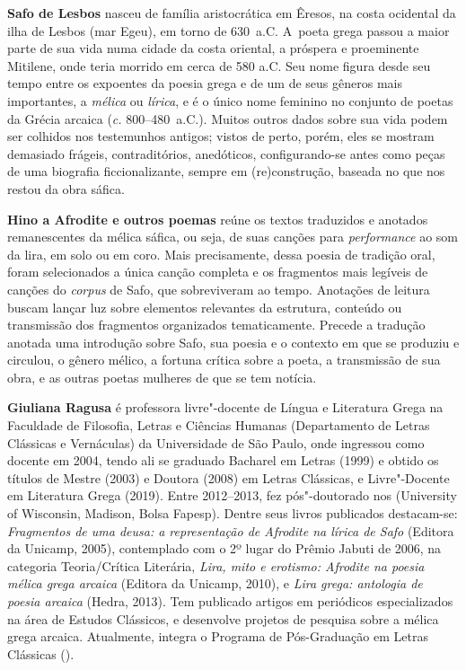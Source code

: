 \textbf{Safo de Lesbos} nasceu de família aristocrática em Êresos, na costa ocidental da ilha de Lesbos
(mar Egeu), em torno de 630~a.C. A~poeta grega passou a maior parte de
sua vida numa cidade da costa oriental, a próspera e proeminente Mitilene, onde
teria morrido em cerca de 580 a.C. Seu nome figura desde seu tempo entre os
expoentes da poesia grega e de um de seus gêneros mais importantes, a
\textit{mélica} ou \textit{lírica}, e é o único nome feminino no conjunto de
poetas da Grécia arcaica (\textit{c.} 800--480~a.C.). Muitos outros dados sobre
sua vida podem ser colhidos nos testemunhos antigos; vistos de perto, porém,
eles se mostram demasiado frágeis, contraditórios, anedóticos, configurando-se
antes como peças de uma biografia ficcionalizante, sempre em (re)construção,
baseada no que nos restou da obra sáfica.

\textbf{Hino a Afrodite e outros poemas} reúne os textos traduzidos e anotados 
remanescentes da mélica sáfica, ou seja, de suas canções para \textit{performance} 
ao som da lira, em solo ou em coro. Mais precisamente, dessa poesia de
tradição oral, foram selecionados a única canção completa e os fragmentos mais legíveis  
de canções do \textit{corpus} de Safo, que sobreviveram ao tempo. 
Anotações de leitura buscam lançar luz sobre elementos
relevantes da estrutura, conteúdo ou transmissão dos fragmentos organizados
tematicamente. Precede a tradução anotada uma introdução sobre Safo, sua poesia
e o contexto em que se produziu e circulou, o gênero mélico, a fortuna crítica
sobre a poeta, a transmissão de sua obra, e as outras poetas mulheres de que
se tem notícia. 

\textbf{Giuliana Ragusa} é professora livre"-docente de Língua e Literatura Grega na Faculdade de Filosofia, Letras e Ciências Humanas (Departamento de Letras Clássicas e Vernáculas) da Universidade de São Paulo, onde ingressou como docente em 2004, tendo ali se graduado Bacharel em Letras (1999) e obtido os títulos de Mestre (2003) e Doutora (2008) em Letras Clássicas, e Livre"-Docente em Literatura Grega (2019). Entre 2012--2013, fez pós"-doutorado nos  (University of Wisconsin, Madison, Bolsa Fapesp). Dentre seus livros publicados destacam-se: 
\textit{Fragmentos de uma deusa: a representação de Afrodite
na lírica de Safo} (Editora da Unicamp, 2005), contemplado com o 2º lugar do 
Prêmio Jabuti de 2006, na categoria Teoria/Crítica Literária,
\textit{Lira, mito e erotismo: Afrodite na poesia mélica grega arcaica} (Editora da Unicamp, 2010), e \emph{Lira grega: antologia de poesia arcaica} (Hedra, 2013). 
Tem publicado artigos em periódicos especializados na
área de Estudos Clássicos, e desenvolve projetos de pesquisa sobre a mélica grega arcaica. Atualmente, integra o Programa de Pós-Graduação em Letras Clássicas ().





